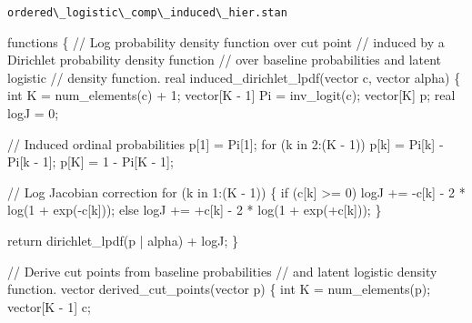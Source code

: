 \documentclass[
  letterpaper,
  DIV=11,
  numbers=noendperiod]{scrartcl}
\newenvironment{Shaded}{\begin{snugshade}}{\end{snugshade}}
\newcommand{\CommentTok}[1]{\textcolor[rgb]{0.37,0.37,0.37}{#1}}
\newcommand{\ControlFlowTok}[1]{\textcolor[rgb]{0.00,0.23,0.31}{#1}}
\newcommand{\DataTypeTok}[1]{\textcolor[rgb]{0.68,0.00,0.00}{#1}}
\newcommand{\DecValTok}[1]{\textcolor[rgb]{0.68,0.00,0.00}{#1}}
\newcommand{\KeywordTok}[1]{\textcolor[rgb]{0.00,0.23,0.31}{#1}}
\newcommand{\NormalTok}[1]{\textcolor[rgb]{0.00,0.23,0.31}{#1}}
\begin{document}
\begin{codelisting}

\caption{\texttt{ordered\textbackslash\_logistic\textbackslash\_comp\textbackslash\_induced\textbackslash\_hier.stan}}

\begin{Shaded}
\begin{Highlighting}[]
\KeywordTok{functions}\NormalTok{ \{}
  \CommentTok{// Log probability density function over cut point}
  \CommentTok{// induced by a Dirichlet probability density function}
  \CommentTok{// over baseline probabilities and latent logistic}
  \CommentTok{// density function.}
  \DataTypeTok{real}\NormalTok{ induced\_dirichlet\_lpdf(}\DataTypeTok{vector}\NormalTok{ c, }\DataTypeTok{vector}\NormalTok{ alpha) \{}
    \DataTypeTok{int}\NormalTok{ K = num\_elements(c) + }\DecValTok{1}\NormalTok{;}
    \DataTypeTok{vector}\NormalTok{[K {-} }\DecValTok{1}\NormalTok{] Pi = inv\_logit(c);}
    \DataTypeTok{vector}\NormalTok{[K] p;}
    \DataTypeTok{real}\NormalTok{ logJ = }\DecValTok{0}\NormalTok{;}

    \CommentTok{// Induced ordinal probabilities}
\NormalTok{    p[}\DecValTok{1}\NormalTok{] = Pi[}\DecValTok{1}\NormalTok{];}
    \ControlFlowTok{for}\NormalTok{ (k }\ControlFlowTok{in} \DecValTok{2}\NormalTok{:(K {-} }\DecValTok{1}\NormalTok{))}
\NormalTok{      p[k] = Pi[k] {-} Pi[k {-} }\DecValTok{1}\NormalTok{];}
\NormalTok{    p[K] = }\DecValTok{1}\NormalTok{ {-} Pi[K {-} }\DecValTok{1}\NormalTok{];}

    \CommentTok{// Log Jacobian correction}
    \ControlFlowTok{for}\NormalTok{ (k }\ControlFlowTok{in} \DecValTok{1}\NormalTok{:(K {-} }\DecValTok{1}\NormalTok{)) \{}
      \ControlFlowTok{if}\NormalTok{ (c[k] \textgreater{}= }\DecValTok{0}\NormalTok{)}
\NormalTok{        logJ += {-}c[k] {-} }\DecValTok{2}\NormalTok{ * log(}\DecValTok{1}\NormalTok{ + exp({-}c[k]));}
      \ControlFlowTok{else}
\NormalTok{        logJ += +c[k] {-} }\DecValTok{2}\NormalTok{ * log(}\DecValTok{1}\NormalTok{ + exp(+c[k]));}
\NormalTok{    \}}

    \ControlFlowTok{return}\NormalTok{ dirichlet\_lpdf(p | alpha) + logJ;}
\NormalTok{  \}}

  \CommentTok{// Derive cut points from baseline probabilities}
  \CommentTok{// and latent logistic density function.}
  \DataTypeTok{vector}\NormalTok{ derived\_cut\_points(}\DataTypeTok{vector}\NormalTok{ p) \{}
    \DataTypeTok{int}\NormalTok{ K = num\_elements(p);}
    \DataTypeTok{vector}\NormalTok{[K {-} }\DecValTok{1}\NormalTok{] c;}


\end{Highlighting}
\end{Shaded}
\end{codelisting}
\end{document}
